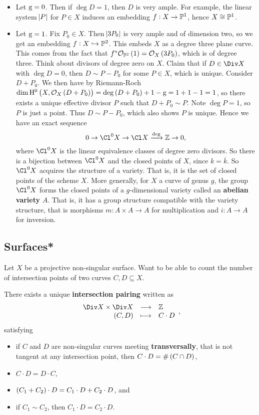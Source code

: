 \begin{example*}
\hfill
\begin{itemize}
\item Let $ \mathrm{g} = 0 $. Then if $ \deg D = 1 $, then $ D $ is very ample. For example, the linear system $ \abs{P} $ for $ P \in X $ induces an embedding $ f : X \to \mathbb{P}^1 $, hence $ X \cong \mathbb{P}^1 $.
\item Let $ \mathrm{g} = 1 $. Fix $ P_0 \in X $. Then $ \abs{3P_0} $ is very ample and of dimension two, so we get an embedding $ f : X \hookrightarrow \mathbb{P}^2 $. This embeds $ X $ as a degree three plane curve. This comes from the fact that $ f^*\OOO_{\PP^2}\br{1} = \OOO_X\br{3P_0} $, which is of degree three. Think about divisors of degree zero on $ X $. Claim that if $ D \in \Div X $ with $ \deg D = 0 $, then $ D \sim P - P_0 $ for some $ P \in X $, which is unique. Consider $ D + P_0 $. We then have by Riemann-Roch $ \dim \H^0\br{X, \OOO_X\br{D + P_0}} = \deg \br{D + P_0} + 1 - \g = 1 + 1 - 1 = 1 $, so there exists a unique effective divisor $ P $ such that $ D + P_0 \sim P $. Note $ \deg P = 1 $, so $ P $ is just a point. Thus $ D \sim P - P_0 $, which also shows $ P $ is unique. Hence we have an exact sequence
$$ 0 \to \Cl^0 X \to \Cl X \xrightarrow{\deg} \ZZ \to 0, $$
where $ \Cl^0 X $ is the linear equivalence classes of degree zero divisors. So there is a bijection between $ \Cl^0 X $ and the closed points of $ X $, since $ k = \overline{k} $. So $ \Cl^0 X $ acquires the structure of a variety. That is, it is the set of closed points of the scheme $ X $. More generally, for $ X $ a curve of genus $ g $, the group $ \Cl^0 X $ forms the closed points of a $ g $-dimensional variety called an \textbf{abelian variety} $ A $. That is, it has a group structure compatible with the variety structure, that is morphisms $ m : A \times A \to A $ for multiplication and $ i : A \to A $ for inversion.
\end{itemize}
\end{example*}

\subsection{Surfaces*}

Let $ X $ be a projective non-singular surface. Want to be able to count the number of intersection points of two curves $ C, D \subseteq X $.

\begin{theorem}
There exists a unique \textbf{intersection pairing} written as
$$ \function{\Div X \times \Div X}{\ZZ}{\br{C, D}}{C \cdot D}, $$
satisfying
\begin{itemize}
\item if $ C $ and $ D $ are non-singular curves meeting \textbf{transversally}, that is not tangent at any intersection point, then $ C \cdot D = \#\br{C \cap D} $,
\item $ C \cdot D = D \cdot C $,
\item $ \br{C_1 + C_2} \cdot D = C_1 \cdot D + C_2 \cdot D $, and
\item if $ C_1 \sim C_2 $, then $ C_1 \cdot D = C_2 \cdot D $.
\end{itemize}
\end{theorem}


